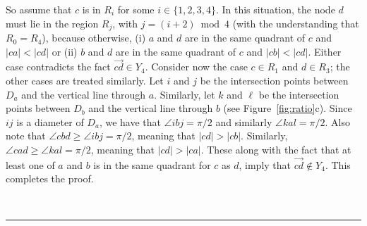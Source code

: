 \pdfoutput=1  \documentclass[11pt]{article}
\newcommand{\qed}{\rule{0.5em}{1.5ex}}
\newcommand{\fqed}{{\hfill~\qed}}
\newenvironment{proof}{{\noindent \bf Proof.}}
                      {{\hfill \fqed} \vspace{1em}}
\begin{document}
\begin{proof}
So assume that $c$ is in $R_i$ for some $i \in \{1,2,3,4\}$. In this situation,
the node $d$ must lie in the region $R_j$, with $j = (i+2) \bmod 4$ (with the
understanding that $R_0 = R_4$),
because otherwise, (i) $a$ and $d$ are in the same quadrant of $c$ and
$|ca|<|cd|$ or (ii) $b$ and $d$ are in the same quadrant of $c$ and
$|cb|<|cd|$. Either case contradicts the fact $\overrightarrow{cd} \in Y_4$.
Consider now the case $c \in R_1$ and $d \in R_3$; the other cases are treated similarly.
Let $i$ and $j$ be the intersection points between $D_a$ and the
vertical line through $a$. Similarly, let $k$ and $\ell$ be the
intersection points between $D_b$ and the vertical line through $b$
(see Figure~\ref{fig:ratio}c).
Since $ij$ is a diameter of $D_a$, we have that $\angle{ibj} = \pi/2$ and similarly
$\angle{kal} = \pi/2$. Also note that $\angle{cbd} \ge \angle{ibj} = \pi/2$,
meaning that $|cd| > |cb|$. Similarly, $\angle{cad} \ge \angle{kal} = \pi/2$,
meaning that $|cd| > |ca|$. These along with the fact that at least one of $a$ and
$b$ is in the same quadrant for $c$ as $d$, imply that
$\overrightarrow{cd} \notin Y_4$. This completes the proof.
\end{proof}
\end{document}
